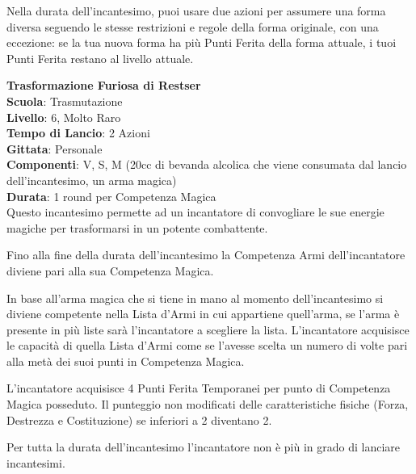 \begin{multicols}{2}
Nella durata dell'incantesimo, puoi usare due azioni per assumere una forma diversa seguendo le stesse restrizioni e regole della forma originale, con una eccezione: se la tua nuova forma ha più Punti Ferita della forma attuale, i tuoi Punti Ferita restano al livello attuale.

\medskip\textbf{Trasformazione Furiosa di Restser}\\
\textbf{Scuola}: Trasmutazione\\
\textbf{Livello}: 6, Molto Raro\\
\textbf{Tempo di Lancio}: 2 Azioni\\
\textbf{Gittata}: Personale\\
\textbf{Componenti}: V, S, M (20cc di bevanda alcolica che viene consumata dal lancio dell'incantesimo, un arma magica)\\
\textbf{Durata}: 1 round per Competenza Magica\\
Questo incantesimo permette ad un incantatore di convogliare le sue energie magiche per trasformarsi in un potente combattente.

Fino alla fine della durata dell'incantesimo la Competenza Armi dell'incantatore diviene pari alla sua Competenza Magica.

In base all'arma magica che si tiene in mano al momento dell'incantesimo si diviene competente nella Lista d'Armi in cui appartiene quell'arma, se l'arma è presente in più liste sarà l'incantatore a scegliere la lista. L'incantatore acquisisce le capacità di quella Lista d'Armi come se l'avesse scelta un numero di volte pari alla metà dei suoi punti in Competenza Magica.

L'incantatore acquisisce 4 Punti Ferita Temporanei per punto di Competenza Magica posseduto.
Il punteggio non modificati delle caratteristiche fisiche (Forza, Destrezza e Costituzione) se inferiori a 2 diventano 2.

Per tutta la durata dell'incantesimo l'incantatore non è più in grado di lanciare incantesimi.


\end{multicols}
